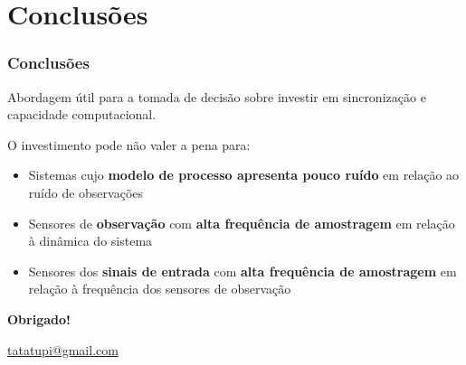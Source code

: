 \documentclass{beamer}
\renewcommand{\(}{\left(}
\renewcommand{\)}{\right)}
\renewcommand{\[}{\left[}
\renewcommand{\]}{\right]}
\begin{document}

\section{Conclusões} 

\begin{frame}
	\frametitle{Conclusões}
Abordagem útil para a tomada de decisão sobre investir em sincronização e capacidade computacional.
\vspace{0.2cm}

O investimento pode não valer a pena para:
	
	\begin{itemize}
		\item Sistemas cujo \textbf{modelo de processo apresenta pouco ruído} em relação ao ruído de observações 
		\item Sensores de \textbf{observação} com \textbf{alta frequência de amostragem} em relação à dinâmica do sistema
		\item Sensores dos \textbf{sinais de entrada} com \textbf{alta frequência de amostragem} em relação à frequência dos sensores de observação
	\end{itemize}

\end{frame}



{
%
\begin{frame}[plain]
\centering
\Large
\textbf{Obrigado!}

\vspace{1cm}
\normalsize
\href{tatatupi@gmail.com}{tatatupi@gmail.com}

\end{frame}
\addtocounter{framenumber}{-1}

}
\end{document}
